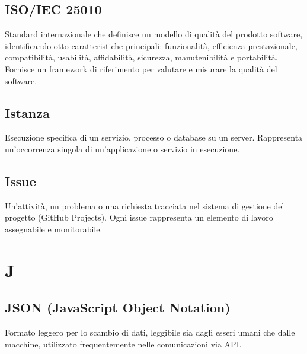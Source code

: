 \documentclass[a4paper, 11pt, oneside]{scrartcl} %
\begin{document}
\subsection*{ISO/IEC 25010}
Standard internazionale che definisce un modello di qualità del prodotto software, identificando otto caratteristiche principali: funzionalità, efficienza prestazionale, compatibilità, usabilità, affidabilità, sicurezza, manutenibilità e portabilità. Fornisce un framework di riferimento per valutare e misurare la qualità del software.
\vspace{0.5cm}

\subsection*{Istanza}


Esecuzione specifica di un servizio, processo o database su un server. Rappresenta un'occorrenza singola di un'applicazione o servizio in esecuzione.

\vspace{0.5cm}

\subsection*{Issue}


Un'attività, un problema o una richiesta tracciata nel sistema di gestione del progetto (GitHub Projects). Ogni issue rappresenta un elemento di lavoro assegnabile e monitorabile.

\vspace{0.5cm}

\section*{J}

\subsection*{JSON (JavaScript Object Notation)}
Formato leggero per lo scambio di dati, leggibile sia dagli esseri umani che dalle macchine, utilizzato frequentemente nelle comunicazioni via API.
\vspace{0.5cm}
\end{document}
